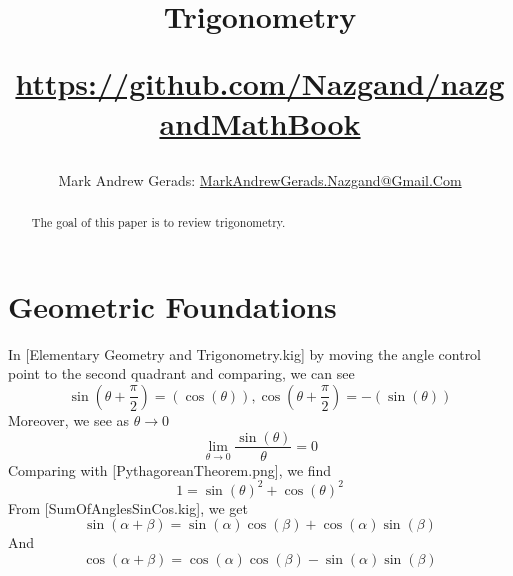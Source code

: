 \documentclass[]{article}
\author{Mark Andrew Gerads: \href{MailTo:MarkAndrewGerads.Nazgand@Gmail.Com}{MarkAndrewGerads.Nazgand@Gmail.Com}}
\title{
	Trigonometry
	
	\href{https://github.com/Nazgand/nazgandMathBook}{https://github.com/Nazgand/nazgandMathBook}
}
\newcommand{\pqty}[1]{{\left(#1\right)}}
\numberwithin{equation}{section}
\begin{document}
	
	\maketitle
	
	\begin{abstract}
		The goal of this paper is to review trigonometry.
	\end{abstract}
	
	\section{Geometric Foundations}
	In [Elementary Geometry and Trigonometry.kig] by moving the angle control point to the second quadrant and comparing, we can see
	\begin{equation}
	\label{SinCosPhaseShift}
	\sin\pqty{\theta+\frac{\pi}{2}}=\pqty{\cos\pqty{\theta}}
	,
	\cos\pqty{\theta+\frac{\pi}{2}}=-\pqty{\sin\pqty{\theta}}
	\end{equation}
	Moreover, we see as \(\theta\to 0\)
	\begin{equation}
	\label{SinXOverXLimit}
	\lim\limits_{\theta\to 0}\frac{\sin\pqty{\theta}}{\theta}=0
	\end{equation}
	Comparing with [PythagoreanTheorem.png], we find
	\begin{equation}
	\label{SinCosPythagoras}
	1=\sin\pqty{\theta}^2+\cos\pqty{\theta}^2
	\end{equation}
	From [SumOfAnglesSinCos.kig], we get
	\begin{equation}
		\label{SinSumOfAngle}
		\sin\pqty{\alpha+\beta}=\sin\pqty{\alpha}\cos\pqty{\beta}+\cos\pqty{\alpha}\sin\pqty{\beta}
	\end{equation}
	And
	\begin{equation}
	\label{CosSumOfAngle}
	\cos\pqty{\alpha+\beta}=\cos\pqty{\alpha}\cos\pqty{\beta}-\sin\pqty{\alpha}\sin\pqty{\beta}
	\end{equation}
	
\end{document}
